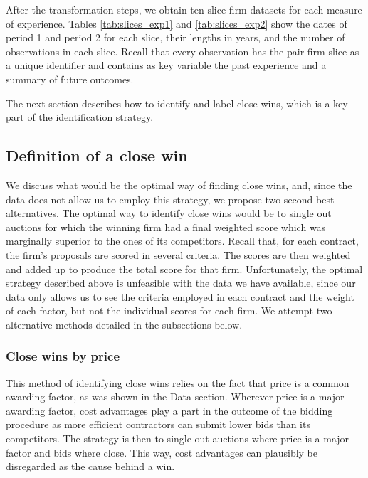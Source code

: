 After the transformation steps, we obtain ten slice-firm datasets for each measure of experience. Tables \ref{tab:slices_exp1} and \ref{tab:slices_exp2} show the dates of period 1 and period 2 for each slice, their lengths in years, and the number of observations in each slice. Recall that every observation has the pair firm-slice as a unique identifier and contains as key variable the past experience and a summary of future outcomes.




The next section describes how to identify and label close wins, which is a key part of the identification strategy.

\subsection{Definition of a close win}
\label{section:findclosewins}
We discuss what would be the optimal way of finding close wins, and, since the data does not allow us to employ this strategy, we propose two second-best alternatives.
The optimal way to identify close wins would be to single out auctions for which the winning firm had a final weighted score which was marginally superior to the ones of its competitors.  Recall that, for each contract, the  firm's proposals are scored in several criteria. The scores are then weighted and added up to produce the total score for that firm. Unfortunately, the optimal strategy described above is unfeasible with the data we have available, since our data only allows us to see the criteria employed in each contract and the weight of each factor, but not the individual scores for each firm. We attempt two alternative methods detailed in the subsections below.

\subsubsection{Close wins by price}
This method of identifying close wins relies on the fact that price is a common awarding factor, as was shown in the Data section. Wherever price is a major awarding factor, cost advantages play a part in the outcome of the bidding procedure as more efficient contractors can submit lower bids than its competitors. The strategy is then to single out auctions where price is a major factor and bids where close. This way, cost advantages can plausibly be disregarded as the cause behind a win.

